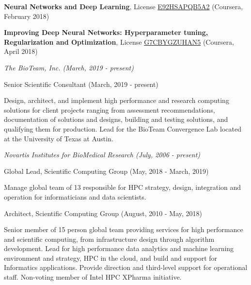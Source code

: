 \documentclass[11pt,article,oneside]{memoir}
\begin{document}
\ind \textbf{Neural Networks and Deep Learning}, License \href{https://www.coursera.org/account/accomplishments/verify/E92HSAPQB5A2}{E92HSAPQB5A2} (Coursera, February 2018)

\ind \textbf{Improving Deep Neural Networks: Hyperparameter tuning, Regularization and Optimization}, License \href{Improving Deep Neural Networks: Hyperparameter tuning, Regularization and Optimization}{G7CBYGZUHAN5} (Coursera, April 2018)
\bigskip

\medskip
\noindent\emph{The BioTeam, Inc. (March, 2019 - present) \vspace{0.01in}}

\ind \footnotesize Senior Scientific Consultant (March, 2019 - present)

\ind \hspace{0.35in} \footnotesize Design, architect, and implement high performance and research computing solutions for client projects ranging from assessment recommendations, documentation of solutions and designs, building and testing solutions, and qualifying them for production. Lead for the BioTeam Convergence Lab located at the University of Texas at Austin.

\vspace{-0.075in}

\normalsize

\bigskip
\noindent\emph{Novartis Institutes for BioMedical Research (July, 2006 - present) \vspace{0.01in}}

\ind \footnotesize Global Lead, Scientific Computing Group (May, 2018 - March, 2019)

\ind \hspace{0.35in} \footnotesize Manage global team of 13 responsible for HPC strategy, design, integration and operation for informaticians and data scientists.

\medskip
\ind \footnotesize Architect, Scientific Computing Group (August, 2010 - May, 2018)


\ind \hspace{0.35in} \footnotesize Senior member of 15 person global team providing services for high performance and scientific computing, from infrastructure design through algorithm development. Lead for high performance data analytics and machine learning environment and strategy, HPC in the cloud, and build and support for Informatics applications. Provide direction and third-level support for operational staff. Non-voting member of Intel HPC XPharma initiative.
\end{document}
